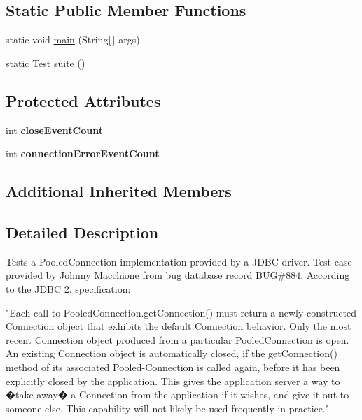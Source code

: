 \subsection*{Static Public Member Functions}
\begin{DoxyCompactItemize}
\item 
static void \mbox{\hyperlink{classtestsuite_1_1regression_1_1_pooled_connection_regression_test_a5c9f916248ffe26706b18f99e4f1246a}{main}} (String\mbox{[}$\,$\mbox{]} args)
\item 
static Test \mbox{\hyperlink{classtestsuite_1_1regression_1_1_pooled_connection_regression_test_ab5bce0e84e27d7745cb282860fe3297f}{suite}} ()
\end{DoxyCompactItemize}
\subsection*{Protected Attributes}
\begin{DoxyCompactItemize}
\item 
\mbox{\label{classtestsuite_1_1regression_1_1_pooled_connection_regression_test_ad10232005bb57d1bd35f4f73a363c51a}} 
int {\bfseries close\+Event\+Count}
\item 
\mbox{\label{classtestsuite_1_1regression_1_1_pooled_connection_regression_test_a84de35b9e122bb662e4c5947849b7383}} 
int {\bfseries connection\+Error\+Event\+Count}
\end{DoxyCompactItemize}
\subsection*{Additional Inherited Members}


\subsection{Detailed Description}
Tests a Pooled\+Connection implementation provided by a J\+D\+BC driver. Test case provided by Johnny Macchione from bug database record B\+UG\#884. According to the J\+D\+BC 2. specification\+:

"Each call to Pooled\+Connection.\+get\+Connection() must return a newly constructed Connection object that exhibits the default Connection behavior. Only the most recent Connection object produced from a particular Pooled\+Connection is open. An existing Connection object is automatically closed, if the get\+Connection() method of its associated Pooled-\/\+Connection is called again, before it has been explicitly closed by the application. This gives the application server a way to �take away� a Connection from the application if it wishes, and give it out to someone else. This capability will not likely be used frequently in practice." 

